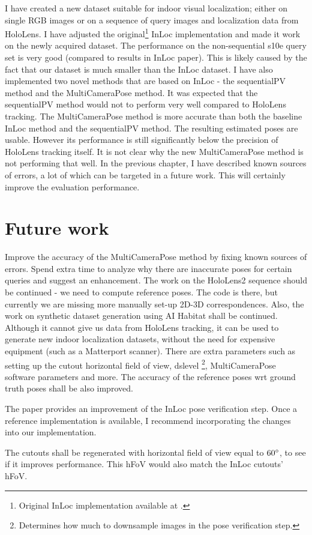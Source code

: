 \documentclass[twoside]{ctuthesis}
\theoremstyle{plain}
\theoremstyle{definition}
\theoremstyle{note}
\newcommand{\code}[1]{{\ttfamily #1%
}}
\begin{document}
I have created a new dataset suitable for indoor visual localization; either on single RGB images or on a sequence of query images and localization data from HoloLens. I have adjusted the original\footnote{Original InLoc implementation available at \cite{InLocImplementation}.} InLoc implementation and made it work on the newly acquired dataset. The performance on the non-sequential s10e query set is very good (compared to results in InLoc paper). This is likely caused by the fact that our dataset is much smaller than the InLoc dataset. I have also implemented two novel methods that are based on InLoc \cite{taira2018inloc} - the sequentialPV method and the MultiCameraPose method. It was expected that the sequentialPV method would not to perform very well compared to HoloLens tracking. The MultiCameraPose method is more accurate than both the baseline InLoc method and the sequentialPV method. The resulting estimated poses are usable. However its performance is still significantly below the precision of HoloLens tracking itself. It is not clear why the new MultiCameraPose method is not performing that well. In the previous chapter, I have described known sources of errors, a lot of which can be targeted in a future work. This will certainly improve the evaluation performance.

\section{Future work}
Improve the accuracy of the MultiCameraPose method by fixing known sources of errors. Spend extra time to analyze why there are inaccurate poses for certain queries and suggest an enhancement. The work on the HoloLens2 sequence should be continued - we need to compute reference poses. The code is there, but currently we are missing more manually set-up 2D-3D correspondences. Also, the work on synthetic dataset generation using AI Habitat shall be continued. Although it cannot give us data from HoloLens tracking, it can be used to generate new indoor localization datasets, without the need for expensive equipment (such as a Matterport scanner). There are extra parameters such as setting up the cutout horizontal field of view, \code{dslevel}\footnote{Determines how much to downsample images in the pose verification step.}, \code{MultiCameraPose} software \cite{MultiCameraPose} parameters and more. The accuracy of the reference poses wrt ground truth poses shall be also improved.

The paper \cite{IsThisTheRightPlace} provides an improvement of the InLoc pose verification step. Once a reference implementation is available, I recommend incorporating the changes into our implementation.

The cutouts shall be regenerated with horizontal field of view equal to $60\degree$, to see if it improves performance. This hFoV would also match the InLoc cutouts' hFoV.

\printindex

\appendix

%


\end{document}
